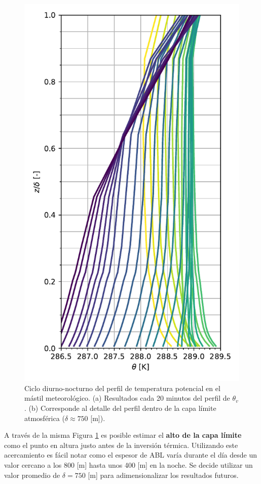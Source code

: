 \begin{figure}[H]
\begin{minipage}{0.5\linewidth}
		\includegraphics[width=0.86\linewidth,trim={0cm 5mm 0cm 0cm},clip]{Imagenes/06/hov/temp_profile}%
	\end{minipage}%
	
	\caption{Ciclo diurno-nocturno del perfil de temperatura potencial en el mástil meteorológico. (a) Resultados cada 20 minutos del perfil de $\theta_v$. (b) Corresponde al detalle del perfil dentro de la capa límite atmosférica ($\delta \approx 750$ [m]).}
	\label{fig:06_hov_pbl}
\end{figure}

A través de la misma Figura \ref{fig:06_hov_pbl} es posible estimar el \textbf{alto de la capa límite} como el punto en altura justo antes de la inversión térmica. Utilizando este acercamiento es fácil notar como el espesor de ABL varía durante el día desde un valor cercano a los 800 [m] hasta unos 400 [m] en la noche. Se decide utilizar un valor promedio de $\delta = 750$ [m] para adimensionalizar los resultados futuros.
